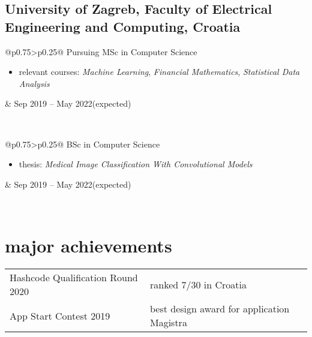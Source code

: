 \documentclass[a4paper]{article}
\makeatletter
\newlength{\tablewidth}
\newenvironment{period}[2]{%
\newcommand{\sarma}{#2}%
\setlength{\tablewidth}{\linewidth}
\addtolength{\tablewidth}{-2\tabcolsep}
\begin{tabular}{@{}p{0.75\tablewidth}>{\raggedleft\arraybackslash}p{0.25\tablewidth}@{}}%
#1 \newline
\begin{itemize}
}{%
\end{itemize} & \sarma \\%
\end{tabular}\\
}
\newenvironment{skills}{%
\setlength{\tablewidth}{\linewidth}
\addtolength{\tablewidth}{-2\tabcolsep}
\begin{tabular}{@{}p{0.22\tablewidth}p{0.78\tablewidth}@{}}
}{%
\end{tabular}
}
\makeatother
\begin{document}
\subsection{University of Zagreb, Faculty of Electrical Engineering and Computing, Croatia}
\begin{period}{Pursuing MSc in Computer Science}{Sep 2019 -- May 2022\linebreak(expected)}
    \item relevant courses:
        \textit{Machine Learning},
        \textit{Financial Mathematics},
        \textit{Statistical Data Analysis}
\end{period}
\begin{period}{BSc in Computer Science}{Sep 2016 -- Jul 2019}
    \item thesis:
        \textit{Medical Image Classification With Convolutional Models}
\end{period}

\section{major achievements}
\begin{skills}
    Hashcode Qualification Round 2020 & ranked 7/30 in Croatia\\
    App Start Contest 2019 & best design award for application Magistra
\end{skills}
\end{document}
